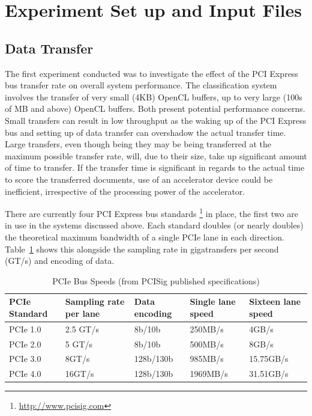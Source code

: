 \section{Experiment Set up and Input Files}

\subsection{Data Transfer}

The first experiment conducted was to investigate the effect of the PCI Express
bus transfer rate on overall system performance. The classification system
involves the transfer of very small (4KB) OpenCL buffers, up to very large (100s
of MB and above) OpenCL buffers. Both present potential performance concerns.
Small transfers can result in low throughput as the waking up of the PCI Express
bus and setting up of data transfer can overshadow the actual transfer time.
Large transfers, even though being they may be being transferred at the maximum
possible transfer rate, will, due to their size, take up significant amount of
time to transfer. If the transfer time is significant in regards to the actual
time to score the transferred documents, use of an accelerator device could be
inefficient, irrespective of the processing power of the accelerator.

There are currently four PCI Express bus standards
\footnote{\url{http://www.pcisig.com}} in place, the first two are in use in the
systems discussed above. Each standard doubles (or nearly doubles) the
theoretical maximum bandwidth of a single PCIe lane in each direction.
Table~\ref{table:pciE} shows this alongside the sampling rate in gigatransfers
per second (GT/s) and encoding of data.

\begin{table}[H]
\begin{tabular}{|l|l|l|l|l|}
\hline
PCIe Standard & Sampling rate per lane & Data encoding & Single lane speed &
Sixteen lane speed\\
\hline
PCIe 1.0 & 2.5 GT/s & 8b/10b & 250MB/s & 4GB/s\\
\hline
PCIe 2.0 & 5 GT/s & 8b/10b & 500MB/s & 8GB/s\\
\hline
PCIe 3.0 & 8GT/s & 128b/130b & 985MB/s & 15.75GB/s\\
\hline
PCIe 4.0 & 16GT/s & 128b/130b & 1969MB/s & 31.51GB/s\\
\hline
\end{tabular}
\caption{PCIe Bus Speeds (from PCISig published specifications)}
\label{table:pciE}
\end{table}

